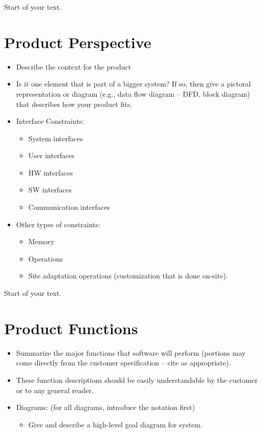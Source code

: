 \documentclass[12pt]{article}
\begin{document}
Start of your text.

\section{Product Perspective}\label{product-perspective}

\begin{itemize}
\item
  Describe the context for the product
\item
  Is it one element that is part of a bigger system? If so, then give a
  pictoral representation or diagram (e.g., data flow diagram -- DFD,
  block diagram) that describes how your product fits.
\item
  Interface Constraints:

  \begin{itemize}
  \item
    System interfaces
  \item
    User interfaces
  \item
    HW interfaces
  \item
    SW interfaces
  \item
    Communication interfaces
  \end{itemize}
\item
  Other types of constraints:

  \begin{itemize}
  \item
    Memory
  \item
    Operations
  \item
    Site adaptation operations (customization that is done on-site).
  \end{itemize}
\end{itemize}

Start of your text.

\section{Product Functions}\label{product-functions}

\begin{itemize}
\item
  Summarize the major functions that software will perform (portions may
  come directly from the customer specification -- cite as appropriate).
\item
  These function descriptions should be easily understandable by the
  customer or to any general reader.
\item
  Diagrams: (for all diagrams, introduce the notation first)

  \begin{itemize}
  \item
    Give and describe a high-level goal diagram for system.
  \end{itemize}
\end{itemize}
\end{document}
